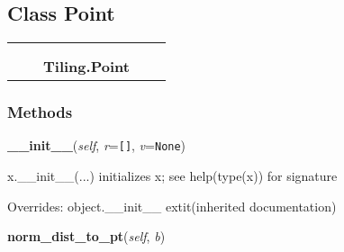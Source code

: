 \subsection{Class Point}

    \label{Tiling:Point}
\begin{tabular}{cccccc}
\multicolumn{2}{r}{\settowidth{\BCL}{object}\multirow{2}{\BCL}{object}}
&&
  \\\cline{3-3}
  &&\multicolumn{1}{c|}{}
&&
  \\
&&\multicolumn{2}{l}{\textbf{Tiling.Point}}
\end{tabular}



  \subsubsection{Methods}

    \vspace{0.5ex}

\hspace{.8\funcindent}\begin{boxedminipage}{\funcwidth}

    \raggedright \textbf{\_\_init\_\_}(\textit{self}, \textit{r}={\tt []}, \textit{v}={\tt None})

\setlength{\parskip}{2ex}
    x.\_\_init\_\_(...) initializes x; see help(type(x)) for signature

\setlength{\parskip}{1ex}
      Overrides: object.\_\_init\_\_ 	extit{(inherited documentation)}

    \end{boxedminipage}

    \label{Tiling:Point:norm_dist_to_pt}

    \vspace{0.5ex}

\hspace{.8\funcindent}\begin{boxedminipage}{\funcwidth}

    \raggedright \textbf{norm\_dist\_to\_pt}(\textit{self}, \textit{b})

\setlength{\parskip}{2ex}
\setlength{\parskip}{1ex}
    \end{boxedminipage}

